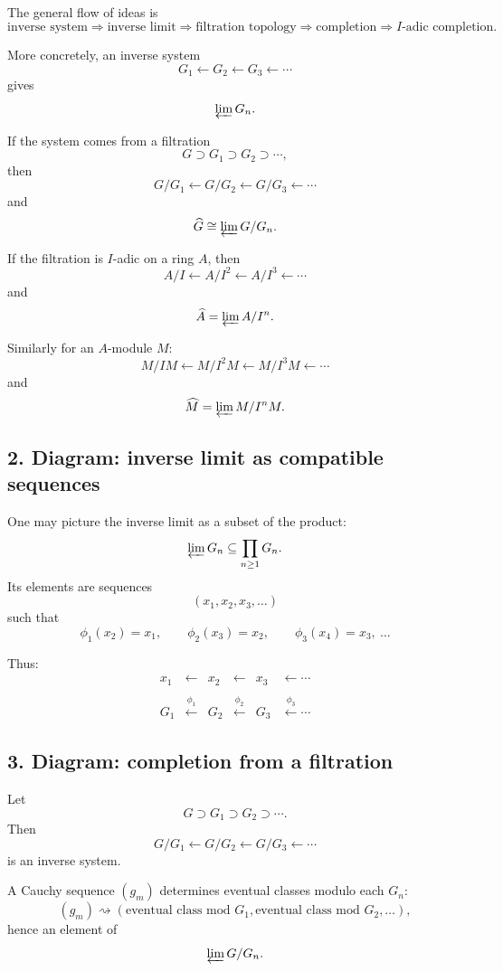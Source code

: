 \documentclass[12pt,a4paper]{article}
\theoremstyle{plain}
\theoremstyle{definition}      %
\begin{document}
The general flow of ideas is
\[
\text{inverse system}
\Longrightarrow
\text{inverse limit}
\Longrightarrow
\text{filtration topology}
\Longrightarrow
\text{completion}
\Longrightarrow
I\text{-adic completion}.
\]

More concretely, an inverse system
\[
G_1 \xleftarrow{} G_2 \xleftarrow{} G_3 \xleftarrow{}\cdots
\]
gives
\[
\varprojlim G_n.
\]

If the system comes from a filtration
\[
G\supset G_1\supset G_2\supset \cdots,
\]
then
\[
G/G_1 \xleftarrow{} G/G_2 \xleftarrow{} G/G_3 \xleftarrow{}\cdots
\]
and
\[
\widehat G \cong \varprojlim G/G_n.
\]

If the filtration is \(I\)-adic on a ring \(A\), then
\[
A/I \xleftarrow{} A/I^2 \xleftarrow{} A/I^3 \xleftarrow{}\cdots
\]
and
\[
\widehat A=\varprojlim A/I^n.
\]

Similarly for an \(A\)-module \(M\):
\[
M/IM \xleftarrow{} M/I^2M \xleftarrow{} M/I^3M \xleftarrow{}\cdots
\]
and
\[
\widehat M=\varprojlim M/I^nM.
\]

\subsection*{2. Diagram: inverse limit as compatible sequences}

One may picture the inverse limit as a subset of the product:
\[
\varprojlim G_n \subseteq \prod_{n\ge1} G_n.
\]
Its elements are sequences
\[
(x_1,x_2,x_3,\dots)
\]
such that
\[
\phi_1(x_2)=x_1,\qquad
\phi_2(x_3)=x_2,\qquad
\phi_3(x_4)=x_3,\ \dots
\]

Thus:
\[
\begin{array}{cccccc}
	x_1 & \leftarrow & x_2 & \leftarrow & x_3 & \leftarrow \cdots \\
	&            &      &            &      & \\
	G_1 & \xleftarrow{\phi_1} & G_2 & \xleftarrow{\phi_2} & G_3 & \xleftarrow{\phi_3}\cdots
\end{array}
\]

\subsection*{3. Diagram: completion from a filtration}

Let
\[
G\supset G_1\supset G_2\supset \cdots.
\]
Then
\[
G/G_1 \xleftarrow{} G/G_2 \xleftarrow{} G/G_3 \xleftarrow{}\cdots
\]
is an inverse system.

A Cauchy sequence \((g_m)\) determines eventual classes modulo each \(G_n\):
\[
(g_m) \rightsquigarrow (\text{eventual class mod }G_1,\text{eventual class mod }G_2,\dots),
\]
hence an element of
\[
\varprojlim G/G_n.
\]
\end{document}
